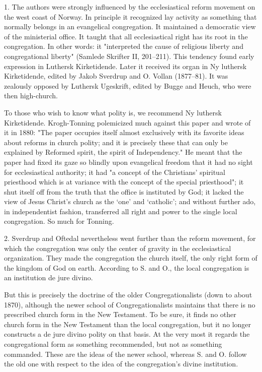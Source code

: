 1. The authors were strongly influenced by the ecclesiastical reform movement on the west coast of Norway. In principle it recognized lay activity as something that normally belongs in an evangelical congregation. It maintained a democratic view of the ministerial office. It taught that all ecclesiastical right has its root in the congregation. In other words: it "interpreted the cause of religious liberty and congregational liberty" (Samlede Skrifter II, 201–211). This tendency found early expression in Luthersk Kirketidende. Later it received its organ in Ny luthersk Kirketidende, edited by Jakob Sverdrup and O. Vollan (1877–81). It was zealously opposed by Luthersk Ugeskrift, edited by Bugge and Heuch, who were then high-church.

To those who wish to know what polity is, we recommend Ny luthersk Kirketidende. Krogh-Tonning polemicized much against this paper and wrote of it in 1880: "The paper occupies itself almost exclusively with its favorite ideas about reforms in church polity; and it is precisely these that can only be explained by Reformed spirit, the spirit of Independency." He meant that the paper had fixed its gaze so blindly upon evangelical freedom that it had no sight for ecclesiastical authority; it had "a concept of the Christians’ spiritual priesthood which is at variance with the concept of the special priesthood"; it shut itself off from the truth that the office is instituted by God; it lacked the view of Jesus Christ’s church as the ‘one’ and ‘catholic’; and without further ado, in independentist fashion, transferred all right and power to the single local congregation. So much for Tonning.

2. Sverdrup and Oftedal nevertheless went further than the reform movement, for which the congregation was only the center of gravity in the ecclesiastical organization. They made the congregation the church itself, the only right form of the kingdom of God on earth. According to S. and O., the local congregation is an institution de jure divino.

But this is precisely the doctrine of the older Congregationalists (down to about 1870), although the newer school of Congregationalists maintains that there is no prescribed church form in the New Testament. To be sure, it finds no other church form in the New Testament than the local congregation, but it no longer constructs a de jure divino polity on that basis. At the very most it regards the congregational form as something recommended, but not as something commanded. These are the ideas of the newer school, whereas S. and O. follow the old one with respect to the idea of the congregation’s divine institution.

